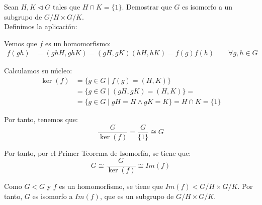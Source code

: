 \begin{ejercicio}
    Sean $H,K\lhd G$ tales que $H\cap K=\{1\}$. Demostrar que $G$ es isomorfo a un subgrupo de $G/H\times G/K$.\\

    Definimos la aplicación:

    Vemos que $f$ es un homomorfismo:
    \begin{align*}
        f(gh) &= (ghH,ghK) = (gH,gK)(hH,hK) = f(g)f(h)\qquad \forall g,h\in G
    \end{align*}

    Calculamos su núcleo:
    \begin{align*}
        \ker(f) &= \{g\in G\mid f(g)=(H,K)\}\\
        &= \{g\in G\mid (gH,gK)=(H,K)\} =\\&= \{g\in G\mid gH=H\wedge gK=K\} = H\cap K = \{1\}
    \end{align*}

    Por tanto, tenemos que:
    \begin{equation*}
        \dfrac{G}{\ker(f)}=\dfrac{G}{\{1\}} \cong G
    \end{equation*}

    Por tanto, por el Primer Teorema de Isomorfía, se tiene que:
    \begin{equation*}
        G\cong \dfrac{G}{\ker(f)}\cong Im(f)
    \end{equation*}

    Como $G<G$ y $f$ es un homomorfismo, se tiene que $Im(f)<G/H\times G/K$. Por tanto, $G$ es isomorfo a $Im(f)$, que es un subgrupo de $G/H\times G/K$.
\end{ejercicio}

